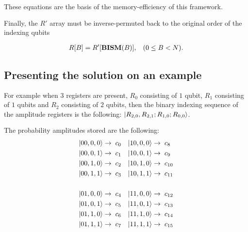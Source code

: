 These equations are the basis of the memory-efficiency of this framework.

Finally, the $R'$ array must be inverse-permuted back to the original order of the indexing qubits

\begin{align*}
R[B] = R'[\text{\textbf{BISM}}(B)], \hspace{3mm}(0\leq{}B<N).
\end{align*}

\subsection{Presenting the solution on an example}

For example when 3 registers are present, $R_0$ consisting of $1$ qubit, $R_1$ consisting of $1$ qubits and $R_2$ consisting of $2$ qubits, then the binary indexing sequence of the amplitude registers is the following: $\ket{R_{2,0},R_{2,1};R_{1,0};R_{0,0}}$.

The probability amplitudes stored are the following:
\begin{align*}
\ket{00,0,0} \rightarrow & \hspace{2mm} c_{0} &
\ket{10,0,0} \rightarrow & \hspace{2mm} c_{8} \\
\ket{00,0,1} \rightarrow & \hspace{2mm} c_{1} &
\ket{10,0,1} \rightarrow & \hspace{2mm} c_{9} \\
\ket{00,1,0} \rightarrow & \hspace{2mm} c_{2} &
\ket{10,1,0} \rightarrow & \hspace{2mm} c_{10} \\
\ket{00,1,1} \rightarrow & \hspace{2mm} c_{3} &
\ket{10,1,1} \rightarrow & \hspace{2mm} c_{11} \\
\\
\ket{01,0,0} \rightarrow & \hspace{2mm} c_{4} &
\ket{11,0,0} \rightarrow & \hspace{2mm} c_{12} \\
\ket{01,0,1} \rightarrow & \hspace{2mm} c_{5} &
\ket{11,0,1} \rightarrow & \hspace{2mm} c_{13} \\
\ket{01,1,0} \rightarrow & \hspace{2mm} c_{6} &
\ket{11,1,0} \rightarrow & \hspace{2mm} c_{14} \\
\ket{01,1,1} \rightarrow & \hspace{2mm} c_{7} &
\ket{11,1,1} \rightarrow & \hspace{2mm} c_{15} \\
\end{align*}

